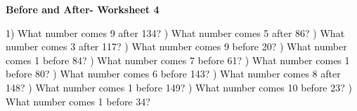 \documentclass{article}%
\begin{document}
\newline%
\newline%
\newline%
\pagebreak%
\large%
\begin{center}%
\textbf{Before and After- Worksheet 4}%
\newline%
\end{center} \normalsize%
1) What number comes 9 after 134?%
\newline%
\newline%
) What number comes 5 after 86?%
\newline%
\newline%
) What number comes 3 after 117?%
\newline%
\newline%
) What number comes 9 before 20?%
\newline%
\newline%
) What number comes 1 before 84?%
\newline%
\newline%
) What number comes 7 before 61?%
\newline%
\newline%
) What number comes 1 before 80?%
\newline%
\newline%
) What number comes 6 before 143?%
\newline%
\newline%
) What number comes 8 after 148?%
\newline%
\newline%
) What number comes 1 before 149?%
\newline%
\newline%
) What number comes 10 before 23?%
\newline%
\newline%
) What number comes 1 before 34?%
\newline%
\newline%
\newline%
\end{document}
